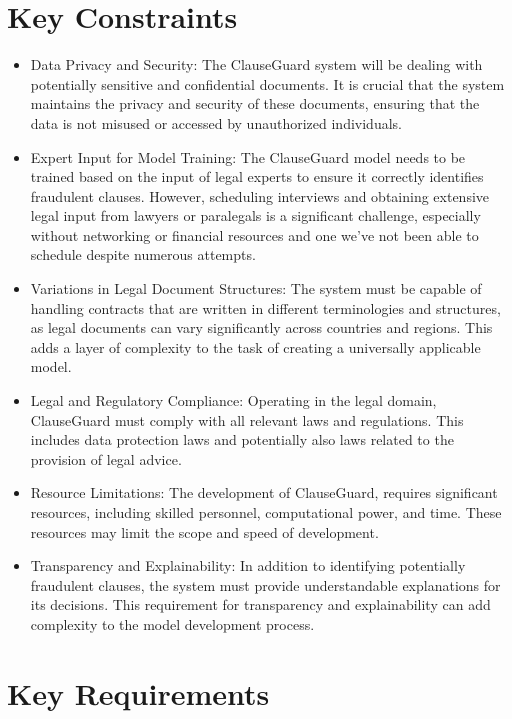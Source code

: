 \section{Key Constraints \label{Section::Key Constraints} }

\begin{itemize}
    \item Data Privacy and Security: The ClauseGuard system will be dealing with potentially sensitive and confidential documents. It is crucial that the system maintains the privacy and security of these documents, ensuring that the data is not misused or accessed by unauthorized individuals.
    \item Expert Input for Model Training: The ClauseGuard model needs to be trained based on the input of legal experts to ensure it correctly identifies fraudulent clauses. However, scheduling interviews and obtaining extensive legal input from lawyers or paralegals is a significant challenge, especially without networking or financial resources and one we've not been able to schedule despite numerous attempts.
    \item Variations in Legal Document Structures: The system must be capable of handling contracts that are written in different terminologies and structures, as legal documents can vary significantly across countries and regions. This adds a layer of complexity to the task of creating a universally applicable model.
    \item Legal and Regulatory Compliance: Operating in the legal domain, ClauseGuard must comply with all relevant laws and regulations. This includes data protection laws and potentially also laws related to the provision of legal advice.
    \item Resource Limitations: The development of ClauseGuard, requires significant resources, including skilled personnel, computational power, and time. These resources may limit the scope and speed of development.
    \item  Transparency and Explainability: In addition to identifying potentially fraudulent clauses, the system must provide understandable explanations for its decisions. This requirement for transparency and explainability can add complexity to the model development process.
    \end{itemize}

\section{Key Requirements \label{Section::Key Requirements}}

